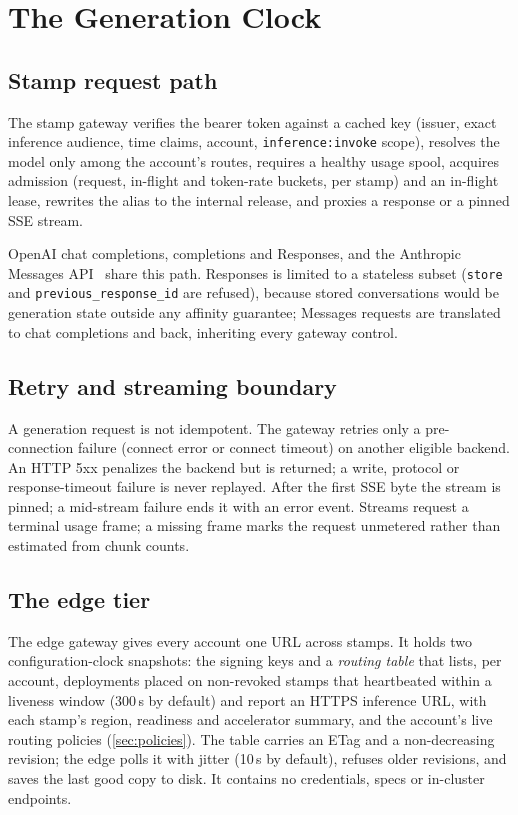 \documentclass[conference,letterpaper]{IEEEtran}
\newcommand{\code}[1]{\texttt{\small #1}}
\begin{document}
\section{The Generation Clock}
\label{sec:gen}

\subsection{Stamp request path}
The stamp gateway verifies the bearer token against a cached key (issuer, exact inference
audience, time claims, account, \code{inference:invoke} scope), resolves the model only among
the account's routes, requires a healthy usage spool, acquires admission (request, in-flight
and token-rate buckets, per stamp) and an in-flight lease, rewrites the alias to the internal
release, and proxies a response or a pinned SSE stream.

OpenAI chat completions, completions and Responses, and the Anthropic Messages
API~\cite{openaiapi,anthropicapi} share this path. Responses is limited to a stateless subset
(\code{store} and \code{previous\_response\_id} are refused), because stored conversations
would be generation state outside any affinity guarantee; Messages requests are translated to
chat completions and back, inheriting every gateway control.

\subsection{Retry and streaming boundary}
\label{sec:retry}
A generation request is not idempotent. The gateway retries only a pre-connection failure
(connect error or connect timeout) on another eligible backend. An HTTP 5xx penalizes the
backend but is returned; a write, protocol or response-timeout failure is never replayed.
After the first SSE byte the stream is pinned; a mid-stream failure ends it with an error
event. Streams request a terminal usage frame; a missing frame marks the request unmetered
rather than estimated from chunk counts.

\subsection{The edge tier}
\label{sec:edge}
The edge gateway gives every account one URL across stamps. It holds two
configuration-clock snapshots: the signing keys and a \emph{routing table} that lists, per
account, deployments placed on non-revoked stamps that heartbeated within a liveness window
(300\,s by default) and report an HTTPS inference URL, with each stamp's region, readiness and
accelerator summary, and the account's live routing policies (\cref{sec:policies}). The table
carries an ETag and a non-decreasing revision; the edge polls it with jitter (10\,s by
default), refuses older revisions, and saves the last good copy to disk. It contains no
credentials, specs or in-cluster endpoints.
\end{document}
